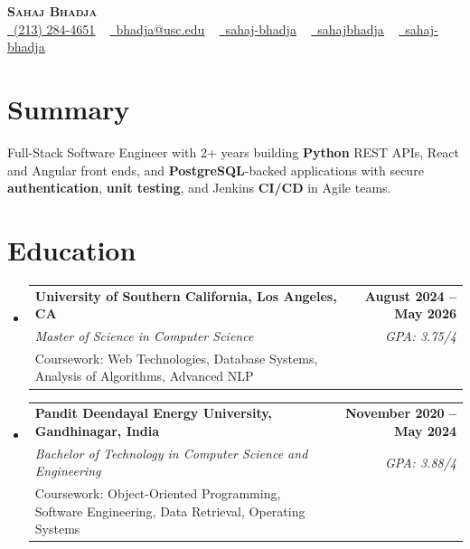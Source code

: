 \documentclass[letterpaper,10pt]{article}
\makeatletter
\newcommand{\sectionGap}{\vspace{-8pt}}
\newcommand{\resumeEduSubheading}[5]{\vspace{-1pt}\item\begin{tabular*}{1.0\textwidth}[t]{l@{\extracolsep{\fill}}r}\textbf{#1} & \textbf{\small #2} \\\textit{\small #3} & \textit{\small #4} \\\small #5 & \\\end{tabular*}\vspace{-4pt}}
\newcommand{\resumeSubHeadingListStart}{\begin{itemize}[leftmargin=0.0in, label={}]}
\newcommand{\resumeSubHeadingListEnd}{\end{itemize}}
\makeatother
\begin{document}
\begin{center}
{\Huge \scshape \textbf{Sahaj Bhadja}} \\ \vspace{1pt}
\small \href{tel:2132844651}{\faPhone\ \underline{(213) 284-4651}} ~ \href{mailto:bhadja@usc.edu}{\raisebox{-0.2\height}\faEnvelope\ \underline{bhadja@usc.edu}} ~
\href{https://www.linkedin.com/in/sahaj-bhadja/}{\raisebox{-0.2\height}\faLinkedin\ \underline{sahaj-bhadja}} ~ \href{https://github.com/SAHAJ-BHADJA}{\raisebox{-0.2\height}\faGithub\ \underline{sahajbhadja}} ~
\href{https://sahaj-bhadja.vercel.app/}{\raisebox{-0.2\height}\faGlobe\ \underline{sahaj-bhadja}}
\end{center}
\vspace{-16pt}
\section{Summary}
\begin{itemize}[leftmargin=0.15in, label={}]
\small{\item{Full-Stack Software Engineer with 2+ years building \textbf{Python} REST APIs, React and Angular front ends, and \textbf{PostgreSQL}-backed applications with secure \textbf{authentication}, \textbf{unit testing}, and Jenkins \textbf{CI/CD} in Agile teams.}}
\end{itemize}
\sectionGap
\section{Education}
\resumeSubHeadingListStart
\resumeEduSubheading{University of Southern California, Los Angeles, CA}{August 2024 -- May 2026}{Master of Science in Computer Science}{GPA: 3.75/4}{Coursework: Web Technologies, Database Systems, Analysis of Algorithms, Advanced NLP}
\resumeEduSubheading{Pandit Deendayal Energy University, Gandhinagar, India}{November 2020 -- May 2024}{Bachelor of Technology in Computer Science and Engineering}{GPA: 3.88/4}{Coursework: Object-Oriented Programming, Software Engineering, Data Retrieval, Operating Systems}
\resumeSubHeadingListEnd
\sectionGap
\end{document}

